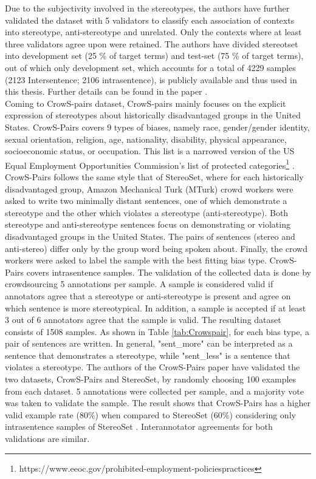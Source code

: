 Due to the subjectivity involved in the stereotypes, the authors have further validated the dataset with 5 validators to classify each association of contexts into stereotype, anti-stereotype and unrelated. Only the contexts where at least three validators agree upon were retained. The authors have divided stereotset into development set (25 \% of target terms) and test-set (75 \% of target terms), out of which only development set, which accounts for a total of 4229 samples (2123 Intersentence; 2106 intrasentence), is publicly available and thus used in this thesis. Further details can be found in the paper \cite{nadeem2020stereoset}.
\\

Coming to CrowS-pairs \cite{nangia2020crows} dataset, CrowS-pairs mainly focuses on the explicit expression of stereotypes about historically disadvantaged groups in the United States. CrowS-Pairs covers 9 types of biases, namely race, gender/gender identity, sexual orientation, religion, age, nationality, disability, physical appearance, socioeconomic status, or occupation. This list is a narrowed version of the US Equal Employment Opportunities Commission's list of protected categories\footnote{https://www.eeoc.gov/prohibited-employment-policiespractices} \cite{nangia2020crows}. CrowS-Pairs follows the same style that of StereoSet\cite{nadeem2020stereoset}, where for each historically disadvantaged group, Amazon Mechanical Turk (MTurk) crowd workers were asked to write two minimally distant sentences, one of which demonstrate a stereotype and the other which violates a stereotype (anti-stereotype). Both stereotype and anti-stereotype sentences focus on demonstrating or violating disadvantaged groups in the United States. The pairs of sentences (stereo and anti-stereo) differ only by the group word being spoken about. Finally, the crowd workers were asked to label the sample with the best fitting bias type. CrowS-Pairs covers intrasentence samples. The validation of the collected data is done by crowdsourcing 5 annotations per sample. A sample is considered valid if annotators agree that a stereotype or anti-stereotype is
present and agree on which sentence is more stereotypical\cite{nangia2020crows}. In addition, a sample is accepted if at least 3 out of 6 annotators agree that the sample is valid. The resulting dataset consists of 1508 samples. As shown in Table \ref{tab:Crowspair}, for each bias type, a pair of sentences are written. In general, "sent\_more" can be interpreted as a sentence that demonstrates a stereotype, while "sent\_less" is a sentence that violates a stereotype. The authors of the CrowS-Pairs paper have validated the two datasets, CrowS-Pairs and StereoSet, by randomly choosing 100 examples from each dataset. 5 annotations were collected per sample, and a majority vote was taken to validate the sample. The result shows that CrowS-Pairs has a higher valid example rate (80\%) when compared to StereoSet (60\%) considering only intrasentence samples of StereoSet \cite{nangia2020crows}. Interannotator agreements for both validations are similar.
\\


